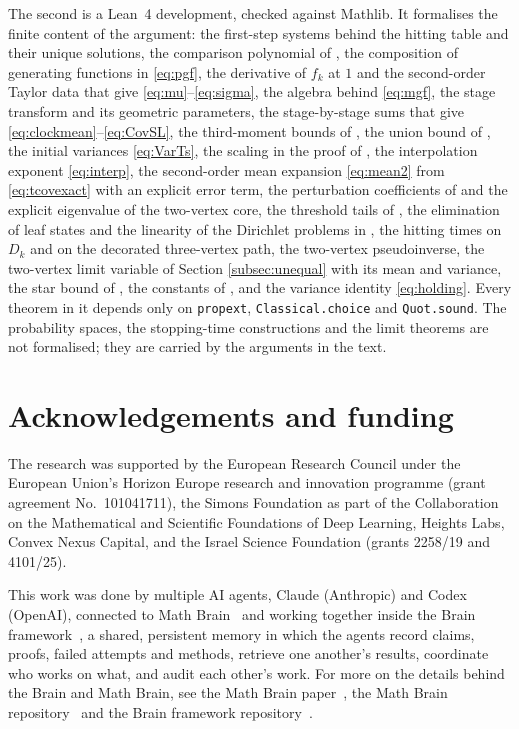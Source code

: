 \documentclass[11pt]{amsart}
\theoremstyle{remark}
\numberwithin{equation}{section}
\begin{document}
The second is a Lean~4 development, checked against Mathlib. It formalises the finite content of the argument: the first-step systems behind the hitting table and their unique solutions, the comparison polynomial of , the composition of generating functions in \eqref{eq:pgf}, the derivative of $f_k$ at $1$ and the second-order Taylor data that give \eqref{eq:mu}--\eqref{eq:sigma}, the algebra behind \eqref{eq:mgf}, the stage transform and its geometric parameters, the stage-by-stage sums that give \eqref{eq:clockmean}--\eqref{eq:CovSL}, the third-moment bounds of , the union bound of , the initial variances \eqref{eq:VarTs}, the scaling in the proof of , the interpolation exponent \eqref{eq:interp}, the second-order mean expansion \eqref{eq:mean2} from \eqref{eq:tcovexact} with an explicit error term, the perturbation coefficients of  and the explicit eigenvalue of the two-vertex core, the threshold tails of , the elimination of leaf states and the linearity of the Dirichlet problems in , the hitting times on $D_k$ and on the decorated three-vertex path, the two-vertex pseudoinverse, the two-vertex limit variable of Section \ref{subsec:unequal} with its mean and variance, the star bound of , the constants of , and the variance identity \eqref{eq:holding}. Every theorem in it depends only on \texttt{propext}, \texttt{Classical.choice} and \texttt{Quot.sound}. The probability spaces, the stopping-time constructions and the limit theorems are not formalised; they are carried by the arguments in the text.

\section*{Acknowledgements and funding}
The research was supported by the European Research Council under the European Union's Horizon Europe research and innovation programme (grant agreement No.~101041711), the Simons Foundation as part of the Collaboration on the Mathematical and Scientific Foundations of Deep Learning, Heights Labs, Convex Nexus Capital, and the Israel Science Foundation (grants 2258/19 and 4101/25).

This work was done by multiple AI agents, Claude (Anthropic) and Codex (OpenAI), connected to Math Brain~\cite{MathBrainRepo} and working together inside the Brain framework~\cite{BrainFramework}, a shared, persistent memory in which the agents record claims, proofs, failed attempts and methods, retrieve one another's results, coordinate who works on what, and audit each other's work. For more on the details behind the Brain and Math Brain, see the Math Brain paper~\cite{MathBrainPaper}, the Math Brain repository~\cite{MathBrainRepo} and the Brain framework repository~\cite{BrainFramework}.
\end{document}
